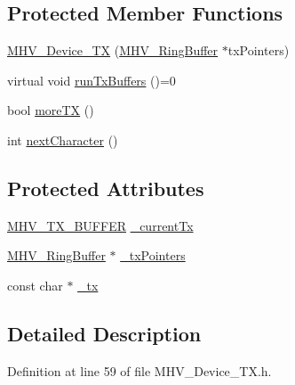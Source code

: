 \subsection*{\-Protected \-Member \-Functions}
\begin{DoxyCompactItemize}
\item 
\hyperlink{class_m_h_v___device___t_x_a5d0f9d3e6d14e5d3edb48fdc0f668c95}{\-M\-H\-V\-\_\-\-Device\-\_\-\-T\-X} (\hyperlink{class_m_h_v___ring_buffer}{\-M\-H\-V\-\_\-\-Ring\-Buffer} $\ast$tx\-Pointers)
\item 
virtual void \hyperlink{class_m_h_v___device___t_x_a3a86067d417c3d5a1f64042ecfcefff7}{run\-Tx\-Buffers} ()=0
\item 
bool \hyperlink{class_m_h_v___device___t_x_a64cba701f06476b494a97620e1a26e86}{more\-T\-X} ()
\item 
int \hyperlink{class_m_h_v___device___t_x_a9e9f436d2b41766db5225c504af96ef5}{next\-Character} ()
\end{DoxyCompactItemize}
\subsection*{\-Protected \-Attributes}
\begin{DoxyCompactItemize}
\item 
\hyperlink{_m_h_v___device___t_x_8h_a8f969362e45e1a805a4a189101bd1f97}{\-M\-H\-V\-\_\-\-T\-X\-\_\-\-B\-U\-F\-F\-E\-R} \hyperlink{class_m_h_v___device___t_x_af2764653ba9f0b2a59bbca39f3987a74}{\-\_\-current\-Tx}
\item 
\hyperlink{class_m_h_v___ring_buffer}{\-M\-H\-V\-\_\-\-Ring\-Buffer} $\ast$ \hyperlink{class_m_h_v___device___t_x_a54a8220b648f9e89a11e8273f91e75fb}{\-\_\-tx\-Pointers}
\item 
const char $\ast$ \hyperlink{class_m_h_v___device___t_x_ace8827a700dcc1a6a54e0bf80906085c}{\-\_\-tx}
\end{DoxyCompactItemize}


\subsection{\-Detailed \-Description}


\-Definition at line 59 of file \-M\-H\-V\-\_\-\-Device\-\_\-\-T\-X.\-h.



